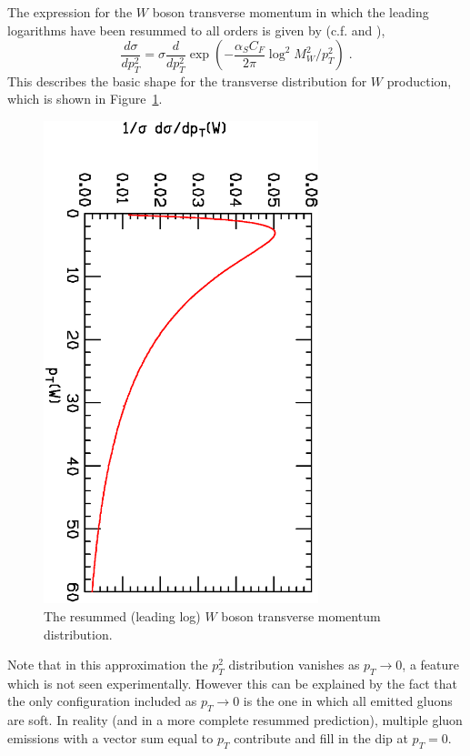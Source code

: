 \documentclass[12pt]{iopart}
\def\as{\alpha_S}
\begin{document}
The expression for the $W$ boson transverse momentum in which the leading logarithms have
been resummed to all orders is given by (c.f.  and ), 
\begin{equation}
\frac{d\sigma}{dp_T^2} = \sigma \frac{d}{dp_T^2}
 \exp \left( -\frac{\as C_F}{2\pi} \log^2M_W^2/p_T^2 \right) \; .
\label{eq:wpt}
\end{equation}
This describes the basic  shape for the transverse distribution for $W$ production, which is shown in
Figure~\ref{fig:pt}.
%
\begin{figure}[t]
\begin{center}
\includegraphics[width=8cm,angle=90]{pt.ps}
\end{center}
\caption{The resummed (leading log) $W$ boson transverse momentum distribution.}
\label{fig:pt}
\end{figure}
%
Note that in this approximation the $p_T^2$ distribution vanishes as $p_T \to 0$, a feature
which is not seen experimentally. However this can be explained by the fact that the only configuration
included as $p_T \to 0$ is the one in which all emitted gluons are soft. In reality (and in a more
complete resummed prediction), multiple gluon emissions with a vector sum equal to $p_T$ contribute
and fill in the dip at $p_T=0$.
\end{document}
